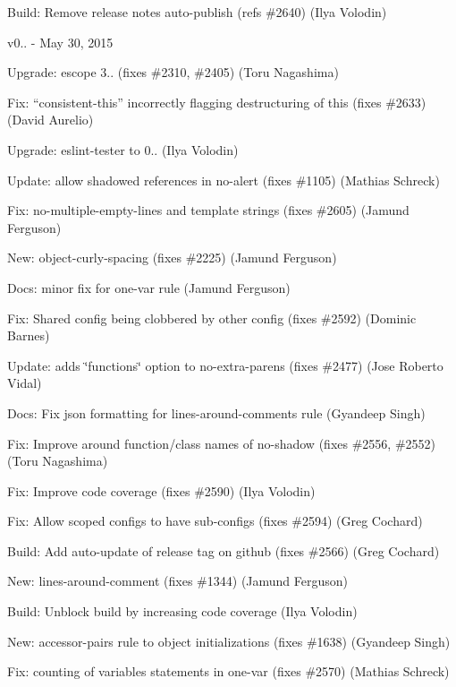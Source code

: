 \begin{DoxyItemize}
\item Build\+: Remove release notes auto-\/publish (refs \#2640) (Ilya Volodin)
\end{DoxyItemize}

v0.. -\/ May 30, 2015


\begin{DoxyItemize}
\item Upgrade\+: escope 3.. (fixes \#2310, \#2405) (Toru Nagashima)
\item Fix\+: “consistent-\/this” incorrectly flagging destructuring of {\ttfamily this} (fixes \#2633) (David Aurelio)
\item Upgrade\+: eslint-\/tester to 0.. (Ilya Volodin)
\item Update\+: allow shadowed references in no-\/alert (fixes \#1105) (Mathias Schreck)
\item Fix\+: no-\/multiple-\/empty-\/lines and template strings (fixes \#2605) (Jamund Ferguson)
\item New\+: object-\/curly-\/spacing (fixes \#2225) (Jamund Ferguson)
\item Docs\+: minor fix for one-\/var rule (Jamund Ferguson)
\item Fix\+: Shared config being clobbered by other config (fixes \#2592) (Dominic Barnes)
\item Update\+: adds \char`\"{}functions\char`\"{} option to no-\/extra-\/parens (fixes \#2477) (Jose Roberto Vidal)
\item Docs\+: Fix json formatting for lines-\/around-\/comments rule (Gyandeep Singh)
\item Fix\+: Improve around function/class names of {\ttfamily no-\/shadow} (fixes \#2556, \#2552) (Toru Nagashima)
\item Fix\+: Improve code coverage (fixes \#2590) (Ilya Volodin)
\item Fix\+: Allow scoped configs to have sub-\/configs (fixes \#2594) (Greg Cochard)
\item Build\+: Add auto-\/update of release tag on github (fixes \#2566) (Greg Cochard)
\item New\+: lines-\/around-\/comment (fixes \#1344) (Jamund Ferguson)
\item Build\+: Unblock build by increasing code coverage (Ilya Volodin)
\item New\+: accessor-\/pairs rule to object initializations (fixes \#1638) (Gyandeep Singh)
\item Fix\+: counting of variables statements in one-\/var (fixes \#2570) (Mathias Schreck)

\end{DoxyItemize}
